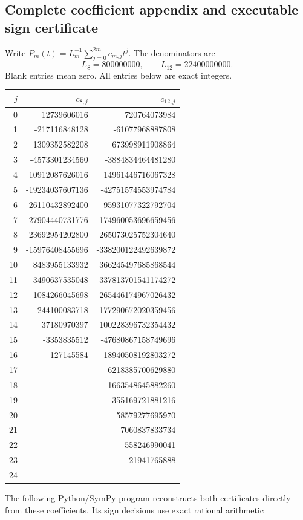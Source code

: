 \documentclass[11pt,a4paper]{article}
\theoremstyle{definition}
\theoremstyle{remark}
\numberwithin{equation}{section}
\begin{document}
\subsection{Complete coefficient appendix and executable sign certificate}
Write $P_m(t)=L_m^{-1}\sum_{j=0}^{2m}c_{m,j}t^j$. The denominators are
\[L_8=800000000,\qquad L_{12}=22400000000.\]
Blank entries mean zero. All entries below are exact integers.
\begin{center}\small
\begin{tabular}{r|r|r}
$j$&$c_{8,j}$&$c_{12,j}$\\\hline
0&12739606016&720764073984\\
1&-217116848128&-61077968887808\\
2&1309352582208&673998911908864\\
3&-4573301234560&-3884834464481280\\
4&10912087626016&14961446716067328\\
5&-19234037607136&-42751574553974784\\
6&26110432892400&95931077322792704\\
7&-27904440731776&-174960053696659456\\
8&23692954202800&265073025752304640\\
9&-15976408455696&-338200122492639872\\
10&8483955133932&366245497685868544\\
11&-3490637535048&-337813701541174272\\
12&1084266045698&265446174967026432\\
13&-244100083718&-177290672020359456\\
14&37180970397&100228396732354432\\
15&-3353835512&-47680867158749696\\
16&127145584&18940508192803272\\
17&&-6218385700629880\\
18&&1663548645882260\\
19&&-355169721881216\\
20&&58579277695970\\
21&&-7060837833734\\
22&&558246990041\\
23&&-21941765888\\
24&&\\
\end{tabular}
\end{center}
The following Python/SymPy program reconstructs both certificates directly
from these coefficients. Its sign decisions use exact rational arithmetic
\end{document}
